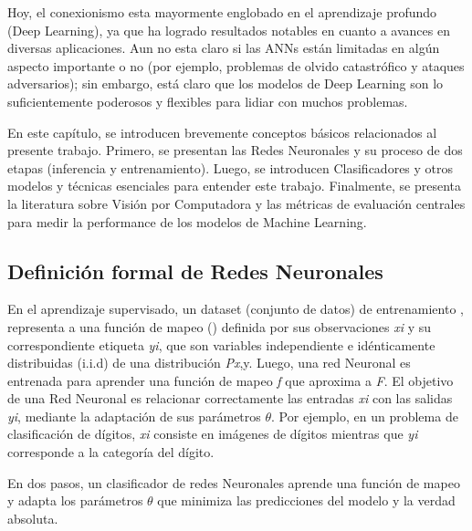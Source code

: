 Hoy, el conexionismo esta mayormente englobado en el aprendizaje profundo (Deep Learning), ya que ha logrado  resultados notables en cuanto a avances en diversas aplicaciones. Aun no esta claro si las ANNs están limitadas en algún aspecto importante o no (por ejemplo, problemas de olvido catastrófico y ataques adversarios); sin embargo, está claro que los modelos de Deep Learning son lo suficientemente poderosos y flexibles para lidiar con muchos problemas.

En este capítulo, se introducen brevemente conceptos básicos relacionados al presente trabajo. Primero, se presentan las Redes Neuronales y su proceso de dos etapas (inferencia y entrenamiento). Luego, se introducen Clasificadores y otros modelos y técnicas esenciales para entender este trabajo. Finalmente, se presenta la literatura sobre Visión por Computadora y las métricas de evaluación centrales para medir la performance de los modelos de Machine Learning.

\subsection{Definición formal de Redes Neuronales}
En el aprendizaje supervisado, un dataset (conjunto de datos) de entrenamiento , representa a una función de mapeo () definida por sus observaciones \textit{xi} y su correspondiente etiqueta \textit{yi}, que son variables independiente e idénticamente distribuidas (i.i.d) de una distribución \textit{Px},y. Luego, una red Neuronal es entrenada para aprender una función de mapeo \textit{f} que aproxima a \textit{F}. El objetivo de una Red Neuronal es relacionar correctamente las entradas \textit{xi} con las salidas \textit{yi}, mediante la adaptación de sus parámetros $\theta$. Por ejemplo, en un problema de clasificación de dígitos, \textit{xi} consiste en imágenes de dígitos mientras que \textit{yi} corresponde a la categoría del dígito.

En dos pasos, un clasificador de redes Neuronales aprende una función de mapeo  y adapta los parámetros $\theta$ que minimiza las predicciones del modelo y la verdad absoluta.

